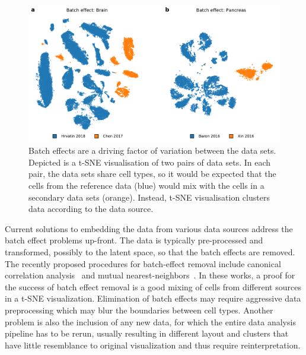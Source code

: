 \documentclass[runningheads]{llncs}
\begin{document}
\begin{figure}[htbp]
\includegraphics[width=\textwidth]{figures/batch_effect.pdf}
\caption{Batch effects are a driving factor of variation between the data sets.
Depicted is a t-SNE visualisation of two pairs of data sets. In each pair, the
data sets share cell types, so it would be expected that the cells from the
reference data (blue) would mix with the cells in a secondary data sets
(orange). Instead, t-SNE visualisation clusters data according to the data
source.} \label{fig:batch_effect}
\end{figure}

Current solutions to embedding the data from various data sources address the
batch effect problems up-front. The data is typically pre-processed and
transformed, possibly to the latent space, so that the batch effects are
removed. The recently proposed procedures for batch-effect removal include
canonical correlation analysis~\cite{cca} and mutual
nearest-neighbors~\cite{mnn,seurat}. In these works, a proof for the success of
batch effect removal is a good mixing of cells from different sources in a
t-SNE visualization. Elimination of batch effects may require aggressive data
preprocessing which may blur the boundaries between cell types. Another problem
is also the inclusion of any new data, for which the entire data analysis
pipeline has to be rerun, usually resulting in different layout and clusters
that have little resemblance to original visualization and thus require
reinterpretation.
\end{document}
